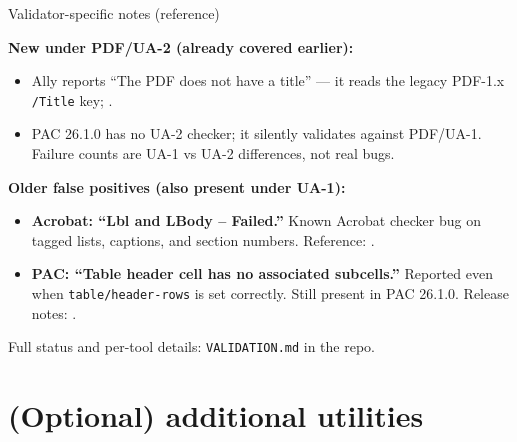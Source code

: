 \begin{frame}{Validator-specific notes (reference)}

\textbf{New under PDF/UA-2 (already covered earlier):}
\begin{itemize}
\item Ally reports ``The PDF does not have a title'' --- it reads the legacy PDF-1.x \texttt{/Title} key; .
\item PAC 26.1.0 has no UA-2 checker; it silently validates against PDF/UA-1. Failure counts are UA-1 vs UA-2 differences, not real bugs.
\end{itemize}

\bigskip

\textbf{Older false positives (also present under UA-1):}
\begin{itemize}
\item \textbf{Acrobat: ``Lbl and LBody -- Failed.''} Known Acrobat checker bug on tagged lists, captions, and section numbers. Reference: .
\item \textbf{PAC: ``Table header cell has no associated subcells.''} Reported even when \texttt{table/header-rows} is set correctly. Still present in PAC 26.1.0. Release notes: .
\end{itemize}

\bigskip

Full status and per-tool details: \texttt{VALIDATION.md} in the repo.

\end{frame}


\section{(Optional) additional utilities}

